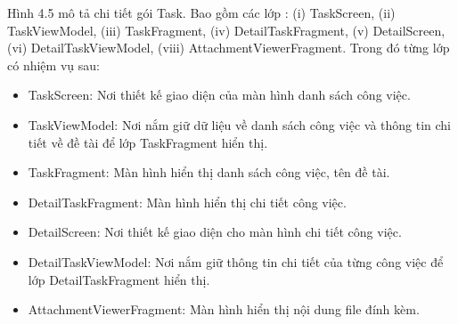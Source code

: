\documentclass[../Main.tex]{subfiles}
\begin{document}
Hình 4.5 mô tả chi tiết gói Task. Bao gồm các lớp : (i) TaskScreen, (ii) TaskViewModel, (iii) TaskFragment, (iv) DetailTaskFragment, (v) DetailScreen, (vi) DetailTaskViewModel, (viii) AttachmentViewerFragment. Trong đó từng lớp có nhiệm vụ sau:
\begin{itemize}
 \item TaskScreen: Nơi thiết kế giao diện của màn hình danh sách công việc.
 \item TaskViewModel: Nơi nắm giữ dữ liệu về danh sách công việc và thông tin chi tiết về đề tài để lớp TaskFragment hiển thị.
 \item TaskFragment: Màn hình hiển thị danh sách công việc, tên đề tài.
 \item DetailTaskFragment: Màn hình hiển thị chi tiết công việc.
 \item DetailScreen: Nơi thiết kế giao diện cho màn hình chi tiết công việc.
 \item DetailTaskViewModel: Nơi nắm giữ thông tin chi tiết của từng công việc để lớp DetailTaskFragment hiển thị. 
 \item AttachmentViewerFragment: Màn hình hiển thị nội dung file đính kèm. 
\end{itemize} \newpage
\end{document}
